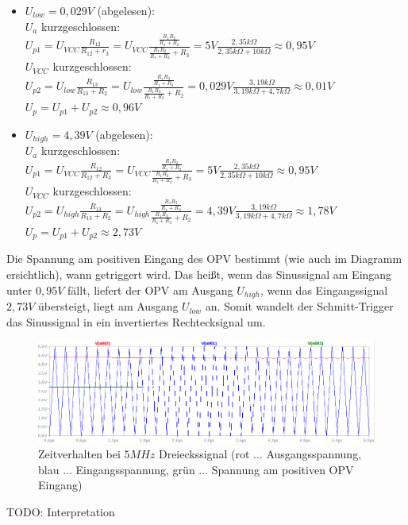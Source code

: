 \documentclass[12pt,a4paper,titlepage]{article}
\begin{document}
\begin{itemize}
  \item $U_{low} = 0,029V$ (abgelesen):\\
  $U_a$ kurzgeschlossen:\\
  $U_{p1} = U_{VCC}\frac{R_{12}}{R_{12}+r_3} = U_{VCC}\frac{\frac{R_1R_2}{R_1+R_2}}{\frac{R_1R_2}{R_1+R_2}+R_3} = 5V\frac{2,35k\Omega}{2,35k\Omega + 10k\Omega} \approx 0,95V$\\
  $U_{VCC}$ kurzgeschlossen:\\
  $U_{p2} = U_{low}\frac{R_{13}}{R_{13}+R_2} = U_{low}\frac{\frac{R_1R_3}{R_1+R_3}}{\frac{R_1R_3}{R_1+R_3}+R_2} = 0,029V\frac{3,19k\Omega}{3,19k\Omega + 4,7k\Omega} \approx 0,01V$\\
  $U_p = U_{p1} + U_{p2} \approx 0,96V$

  \item $U_{high} = 4,39V$ (abgelesen):\\
  $U_a$ kurzgeschlossen:\\
  $U_{p1} = U_{VCC}\frac{R_{12}}{R_{12}+R_3} = U_{VCC}\frac{\frac{R_1R_2}{R_1+R_2}}{\frac{R_1R_2}{R_1+R_2}+R_3} = 5V\frac{2,35k\Omega}{2,35k\Omega + 10k\Omega} \approx 0,95V$\\
  $U_{VCC}$ kurzgeschlossen:\\
  $U_{p2} = U_{high}\frac{R_{13}}{R_{13}+R_2} = U_{high}\frac{\frac{R_1R_3}{R_1+R_3}}{\frac{R_1R_3}{R_1+R_3}+R_2} = 4,39V\frac{3,19k\Omega}{3,19k\Omega + 4,7k\Omega} \approx 1,78V$\\
  $U_p = U_{p1} + U_{p2} \approx 2,73V$
\end{itemize}

\noindent Die Spannung am positiven Eingang des OPV bestimmt (wie auch im Diagramm ersichtlich), wann getriggert wird. Das heißt, wenn das Sinussignal am Eingang unter $0,95V$ f\"allt, liefert der OPV am Ausgang $U_{high}$, wenn das Eingangssignal $2,73V$ \"ubersteigt, liegt am Ausgang $U_{low}$ an. Somit wandelt der Schmitt-Trigger das Sinussignal in ein invertiertes Rechtecksignal um.

\begin{figure}[H]
  \centering
  \includegraphics[width=150mm]{schmitt_transient_final.png}
  \caption{Zeitverhalten bei $5MHz$ Dreieckssignal (rot $\hdots$ Ausgangsspannung, blau $\hdots$ Eingangsspannung, gr\"un $\hdots$ Spannung am positiven OPV Eingang)}
\end{figure}

\noindent TODO: Interpretation
\end{document}
